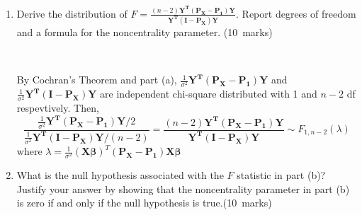 \documentclass[soln,12pt]{utarexam}
\begin{document}
\begin{enumerate}
\begin{enumerate}
\item Derive the distribution of $F = \frac{(n-2)\mathbf{Y^T(P_X-P_1)Y}}{\mathbf{Y^T(I-P_X)Y}}$.
Report degrees of freedom and a formula for the noncentrality parameter. \hfill(10~marks)
\begin{answer}~ 

By Cochran's Theorem and part (a), $\frac{1}{\sigma^2}\mathbf{Y^T(P_X-P_1)Y}$ and $\frac{1}{\sigma^2}\mathbf{Y^T(I-P_X)Y}$ are independent chi-square distributed with 1 and $n-2$ df respevtively. Then,
$$\frac{\frac{1}{\sigma^2}\mathbf{Y^T(P_X-P_1)Y}/2}{\frac{1}{\sigma^2}\mathbf{Y^T(I-P_X)Y}/(n-2)} =  \frac{(n-2)\mathbf{Y^T(P_X-P_1)Y}}{\mathbf{Y^T(I-P_X)Y}}
\sim F_{1, n-2}(\lambda)$$
where $\lambda = \frac{1}{\sigma^2}(\mathbf{X}\bm{\beta})^T(\mathbf{P_X-P_1})\mathbf{X}\bm{\beta}$  
\end{answer}

\item What is the null hypothesis associated with the $F$ statistic in part (b)? Justify your
answer by showing that the noncentrality parameter in part (b) is zero if and only if
the null hypothesis is true.\hfill(10~marks)
\begin{answer}~


\end{answer}
\end{enumerate}
\end{enumerate}
\end{document}
